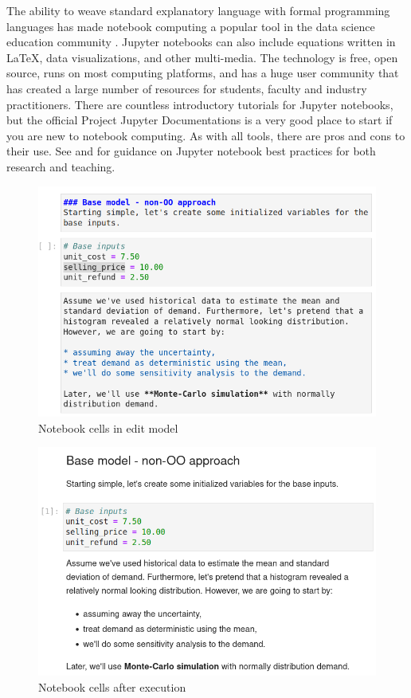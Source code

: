 \documentclass[ited,blindrev]{informs3}              %
\begin{document}
The ability to weave standard explanatory language with formal programming languages has made notebook computing a popular tool in the data science education community \cite{perkel2018jupyter}. Jupyter notebooks can also include equations written in \LaTeX, data visualizations, and other multi-media. The technology is free, open source, runs on most computing platforms, and has a huge user community that has created a large number of resources for students, faculty and industry practitioners. There are countless introductory tutorials for Jupyter notebooks, but the official Project Jupyter Documentations \cite{jupyterteamProjectJupyterDocumentation2015} is a very good place to start if you are new to notebook computing. As with all tools, there are pros and cons to their use. See \cite{rule2018ten, barba2019teaching} and \cite{johnson2020benefits} for guidance on Jupyter notebook best practices for both research and teaching.



\begin{figure}[!htbp]
\centering
\includegraphics[scale=0.5]{cells_edit_mode}
\caption{Notebook cells in edit model}
\label{fig:cells_edit_mode}
\end{figure}

\begin{figure}[!htbp]
\centering
\includegraphics[scale=0.5]{cells_after_running}
\caption{Notebook cells after execution}
\label{fig:cells_after_running}
\end{figure}
\end{document}
